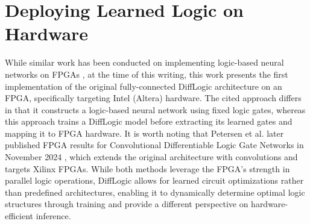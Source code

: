 


\section{Deploying Learned Logic on Hardware}
\label{sec:fpga}

While similar work has been conducted on implementing logic-based neural networks on FPGAs \cite{logicgate-fpga}, at the time of this writing, this work presents the first implementation of the original fully-connected DiffLogic architecture on an FPGA, specifically targeting Intel (Altera) hardware. The cited approach differs in that it constructs a logic-based neural network using fixed logic gates, whereas this approach trains a DiffLogic model before extracting its learned gates and mapping it to FPGA hardware. It is worth noting that Petersen et al. later published FPGA results for Convolutional Differentiable Logic Gate Networks in November 2024 \cite{convdifflogic}, which extends the original architecture with convolutions and targets Xilinx FPGAs. While both methods leverage the FPGA's strength in parallel logic operations, DiffLogic allows for learned circuit optimizations rather than predefined architectures, enabling it to dynamically determine optimal logic structures through training and provide a different perspective on hardware-efficient inference. 

